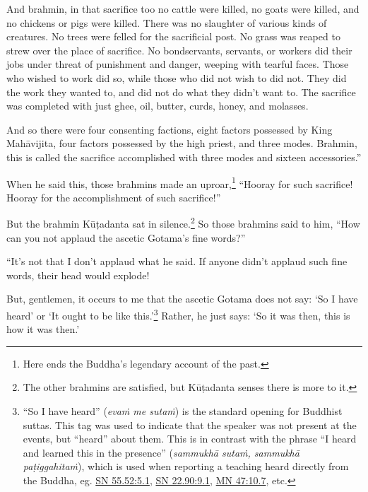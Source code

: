 \documentclass[12pt,openany]{book}%
\begin{document}
And brahmin, in that sacrifice too no cattle were killed, no goats were killed, and no chickens or pigs were killed. There was no slaughter of various kinds of creatures. No trees were felled for the sacrificial post. No grass was reaped to strew over the place of sacrifice. No bondservants, servants, or workers did their jobs under threat of punishment and danger, weeping with tearful faces. Those who wished to work did so, while those who did not wish to did not. They did the work they wanted to, and did not do what they didn’t want to. The sacrifice was completed with just ghee, oil, butter, curds, honey, and molasses. 

And so there were four consenting factions, eight factors possessed by King \textsanskrit{Mahāvijita}, four factors possessed by the high priest, and three modes. Brahmin, this is called the sacrifice accomplished with three modes and sixteen accessories.” 

When he said this, those brahmins made an uproar,\footnote{Here ends the Buddha’s legendary account of the past. } “Hooray for such sacrifice! Hooray for the accomplishment of such sacrifice!” 

But the brahmin \textsanskrit{Kūṭadanta} sat in silence.\footnote{The other brahmins are satisfied, but \textsanskrit{Kūṭadanta} senses there is more to it. } So those brahmins said to him, “How can you not applaud the ascetic Gotama’s fine words?” 

“It’s not that I don’t applaud what he said. If anyone didn’t applaud such fine words, their head would explode! 

But, gentlemen, it occurs to me that the ascetic Gotama does not say: ‘So I have heard’ or ‘It ought to be like this.’\footnote{“So I have heard” (\textit{\textsanskrit{evaṁ} me \textsanskrit{sutaṁ}}) is the standard opening for Buddhist suttas. This tag was used to indicate that the speaker was not present at the events, but “heard” about them. This is in contrast with the phrase “I heard and learned this in the presence” (\textit{\textsanskrit{sammukhā} \textsanskrit{sutaṁ}, \textsanskrit{sammukhā} \textsanskrit{paṭiggahitaṁ}}), which is used when reporting a teaching heard directly from the Buddha, eg. \href{https://suttacentral.net/sn55.52/en/sujato\#5.1}{SN 55.52:5.1}, \href{https://suttacentral.net/sn22.90/en/sujato\#9.1}{SN 22.90:9.1}, \href{https://suttacentral.net/mn47/en/sujato\#10.7}{MN 47:10.7}, etc. } Rather, he just says: ‘So it was then, this is how it was then.’ 
\end{document}
